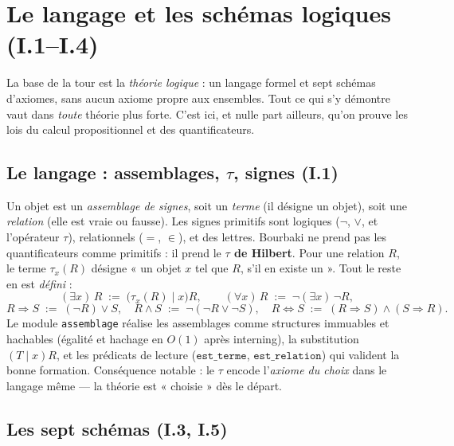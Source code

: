 \section{Le langage et les schémas logiques (I.1--I.4)}

La base de la tour est la \emph{théorie logique} : un langage formel et sept
schémas d'axiomes, sans aucun axiome propre aux ensembles. Tout ce qui s'y
démontre vaut dans \emph{toute} théorie plus forte. C'est ici, et nulle part
ailleurs, qu'on prouve les lois du calcul propositionnel et des quantificateurs.

\subsection{Le langage : assemblages, $\tau$, signes (I.1)}

Un objet est un \emph{assemblage de signes}, soit un \emph{terme} (il désigne un
objet), soit une \emph{relation} (elle est vraie ou fausse). Les signes
primitifs sont logiques ($\neg$, $\vee$, et l'opérateur $\tau$), relationnels
($=$, $\in$), et des lettres. Bourbaki ne prend pas les quantificateurs comme
primitifs : il prend le \textbf{$\tau$ de Hilbert}. Pour une relation $R$, le
terme $\tau_x(R)$ désigne « un objet $x$ tel que $R$, s'il en existe un ». Tout
le reste en est \emph{défini} :
\[
  (\exists x)\,R \;:=\; \bigl(\tau_x(R)\mid x\bigr)R,
  \qquad
  (\forall x)\,R \;:=\; \neg(\exists x)\,\neg R,
\]
\[
  R\Rightarrow S \;:=\; (\neg R)\vee S,
  \quad
  R\wedge S \;:=\; \neg(\neg R\vee\neg S),
  \quad
  R\Leftrightarrow S \;:=\; (R\Rightarrow S)\wedge(S\Rightarrow R).
\]
Le module \texttt{assemblage} réalise les assemblages comme structures
immuables et hachables (égalité et hachage en $O(1)$ après interning), la
substitution $(T\mid x)R$, et les prédicats de lecture
($\texttt{est\_terme}$, $\texttt{est\_relation}$) qui valident la bonne
formation. Conséquence notable : le $\tau$ encode l'\emph{axiome du choix} dans
le langage même --- la théorie est « choisie » dès le départ.

\subsection{Les sept schémas (I.3, I.5)}

